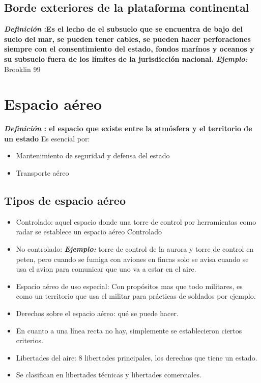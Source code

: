 \subsection{Borde exteriores de la plataforma continental}
\textbf{\emph{Definición} :Es el lecho de el subsuelo que se encuentra de bajo del suelo del mar, se pueden tener cables, se pueden hacer perforaciones siempre con el consentimiento del estado, fondos marínos y oceanos y su subsuelo fuera de los límites de la jurisdicción nacional.}\newline 
\textbf{\emph{Ejemplo:}} Brooklin 99


\section{Espacio aéreo}
\textbf{\emph{Definición} : el espacio que existe entre la atmósfera y el territorio de un estado} \newline 
Es esencial por:
\begin{itemize}
    \item Mantenimiento de seguridad y defensa del estado
    \item Transporte aéreo
\end{itemize}

\subsection{Tipos de espacio aéreo}
\begin{itemize}
    \item Controlado: aquel espacio donde una torre de control por herramientas como radar se establece un espacio aéreo Controlado
    \item No controlado: \textbf{\emph{Ejemplo:}} torre de control de la aurora y torre de control en peten, pero cuando se fumiga con aviones en fincas solo se avisa cuando se usa el avion para comunicar que uno va a estar en el aire.
    \item Espacio aéreo de uso especial: Con propósitos mas que todo militares, es como un territorio que usa el militar para prácticas de soldados por ejemplo.
    \item Derechos sobre el espacio aéreo: qué se puede hacer.
    \item En cuanto a una línea recta no hay, simplemente se establecieron ciertos criterios.
    \item Libertades del aire: 8 libertades principales, los derechos que tiene un estado.
    \item Se clasifican en libertades técnicas y libertades comerciales.
\end{itemize}


